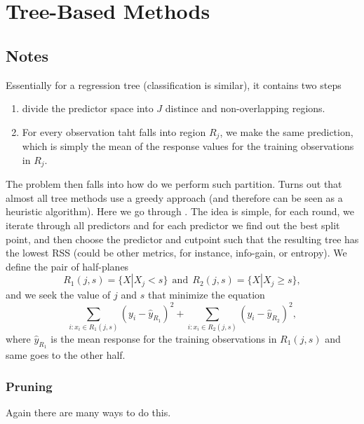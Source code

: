 \section{Tree-Based Methods}
\subsection{Notes}
Essentially for a regression tree (classification is similar), it contains two steps
\begin{enumerate}
	\setlength\itemsep{0em}
	\item divide the predictor space into $J$ distince and non-overlapping regions.
	\item For every observation taht falls into region $R_j$, we make the same prediction, which is simply the mean of the response values for the training observations in $R_j$.
\end{enumerate}

The problem then falls into how do we perform such partition. Turns out that almost all tree methods use a greedy approach (and therefore can be seen as a heuristic algorithm). Here we go through . The idea is simple, for each round, we iterate through all predictors and for each predictor we find out the best split point, and then choose the predictor and cutpoint such that the resulting tree has the lowest RSS (could be other metrics, for instance, info-gain, or entropy). We define the pair of half-planes $$ R_1(j,s)=\{X|X_j < s\}\ \ \text{and}\ \ R_2(j,s) = \{X|X_j \geq s \},$$ and we seek the value of $j$ and $s$ that minimize the equation $$ \sum_{i:x_i \in R_1(j, s)} (y_i - \hat{y}_{R_1})^2 + \sum_{i:x_i \in R_2(j, s)} (y_i - \hat{y}_{R_2})^2,$$ where $\hat{y}_{R_1}$ is the mean response for the training observations in $R_1(j,s)$ and same goes to the other half.
\subsubsection{Pruning}
Again there are many ways to do this. 
